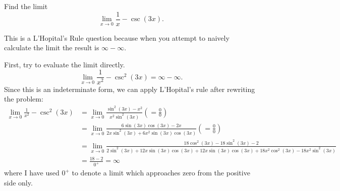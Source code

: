 \documentclass{ximera}
\author{Emma Smith Zbarsky}
\begin{document}
\begin{exercise}

Find the limit \[\lim_{x \to 0} \frac{1}{x}- \csc(3x).\]


\begin{hint}
This is a L'Hopital's Rule question because when you attempt to naively
calculate the limit the result is $\infty-\infty$.
\end{hint}


\begin{hint}
First, try to evaluate the limit directly.
\[\lim_{x\to 0} \frac{1}{x^2} - \csc^2(3x) = \infty-\infty.\] Since this
is an indeterminate form, we can apply L'Hopital's rule after rewriting
the problem: \begin{align*}
\lim_{x\to 0} \frac{1}{x^2}-\csc^2(3x) &= \lim_{x\to 0} \frac{\sin^2(3x)-x^2}{x^2\sin^2(3x)} \left( = \frac{0}{0}\right)\\
&=  \lim_{x\to 0} \frac{6\sin(3x)\cos(3x)-2x}{2x\sin^2(3x)+6x^2\sin(3x)\cos(3x)} \left( =\frac{0}{0}\right) \\
&= \lim_{x\to 0} \frac{18\cos^2(3x)-18\sin^2(3x)-2}{2\sin^2(3x)+12x\sin(3x)\cos(3x)+12x\sin(3x)\cos(3x) + 18x^2\cos^2(3x)-18x^2\sin^2(3x)} \\
&= \frac{18-2}{0^+} = \infty
\end{align*} where I have used $0^+$ to denote a limit which
approaches zero from the positive side only.
\end{hint}


\begin{multipleChoice}
\choice{$-\infty$}
\choice[correct]{$\infty$}
\end{multipleChoice}

\end{exercise}
\end{document}
